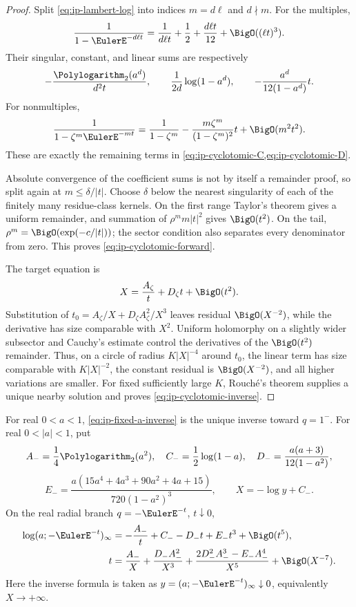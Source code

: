 \begin{proof}
Split \cref{eq:ip-lambert-log} into indices \(m=d\ell\) and \(d\nmid m\).
For the multiples,
\[
 \frac1{1-\EulerE^{-d\ell t}}
 =\frac1{d\ell t}+\frac12+\frac{d\ell t}{12}
 +\BigO((\ell t)^3).
\]
Their singular, constant, and linear sums are respectively
\[
 -\frac{\Polylogarithm_2(a^d)}{d^2t},\qquad
 \frac1{2d}\log(1-a^d),\qquad
 -\frac{a^d}{12(1-a^d)}t.
\]
For nonmultiples,
\[
 \frac1{1-\zeta^m\EulerE^{-mt}}
 =\frac1{1-\zeta^m}
 -\frac{m\zeta^m}{(1-\zeta^m)^2}t
 +\BigO(m^2t^2).
\]
These are exactly the remaining terms in
\cref{eq:ip-cyclotomic-C,eq:ip-cyclotomic-D}.

Absolute convergence of the coefficient sums is not by itself a remainder
proof, so split again at \(m\leq\delta/|t|\).  Choose \(\delta\) below the
nearest singularity of each of the finitely many residue-class kernels.  On
the first range Taylor's theorem gives a uniform remainder, and summation of
\(\rho^m m|t|^2\) gives \(\BigO(t^2)\).  On the tail,
\(\rho^m=\BigO(\exp(-c/|t|))\); the sector condition also separates every
denominator from zero.  This proves \cref{eq:ip-cyclotomic-forward}.

The target equation is
\[
 X=\frac{A_\zeta}t+D_\zeta t+\BigO(t^2).
\]
Substitution of \(t_0=A_\zeta/X+D_\zeta A_\zeta^2/X^3\) leaves residual
\(\BigO(X^{-2})\), while the derivative has size comparable with \(X^2\).
Uniform holomorphy on a slightly wider subsector and Cauchy's estimate control
the derivatives of the \(\BigO(t^2)\) remainder.  Thus, on a circle of radius
\(K|X|^{-4}\) around \(t_0\), the linear term has size comparable with
\(K|X|^{-2}\), the constant residual is \(\BigO(X^{-2})\), and all higher
variations are smaller.  For fixed sufficiently large \(K\), Rouché's theorem
supplies a unique nearby solution and proves
\cref{eq:ip-cyclotomic-inverse}.
\end{proof}

\begin{corollary}
\label{cor:ip-plus-minus-one}
For real \(0<a<1\), \cref{eq:ip-fixed-a-inverse} is the unique inverse toward
\(q=1^-\).  For real \(0<|a|<1\), put
\[
 A_-=\frac14\Polylogarithm_2(a^2),\quad
 C_-=\frac12\log(1-a),\quad
 D_-=\frac{a(a+3)}{12(1-a^2)},
\]
\[
 E_-=\frac{a(15a^4+4a^3+90a^2+4a+15)}
 {720(1-a^2)^3},\qquad X=-\log y+C_-.
\]
On the real radial branch \(q=-\EulerE^{-t}\), \(t\downarrow0\),
\begin{align}
 \log(a;-\EulerE^{-t})_\infty
 &=-\frac{A_-}t+C_--D_-t+E_-t^3+\BigO(t^5),
 \label{eq:ip-minus-one-forward}\\
 t&=\frac{A_-}X+\frac{D_-A_-^2}{X^3}
 +\frac{2D_-^2A_-^3-E_-A_-^4}{X^5}
 +\BigO(X^{-7}).
 \label{eq:ip-minus-one-inverse}
\end{align}
Here the inverse formula is taken as
\(y=(a;-\EulerE^{-t})_\infty\downarrow0\), equivalently \(X\to+\infty\).
\end{corollary}

